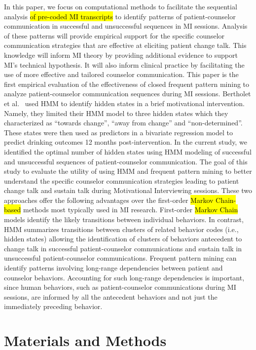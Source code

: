 \documentclass[smallextended]{svjour3}       %
\begin{document}
In this paper, we focus on computational methods to facilitate the sequential analysis \hl{of pre-coded MI transcripts} to identify patterns of patient-counselor communication in successful and unsuccessful sequences in MI sessions. Analysis of these patterns will provide empirical support for the specific counselor communication strategies that are effective at eliciting patient change talk. This knowledge will inform MI theory by providing additional evidence to support MI's technical hypothesis. It will also inform clinical practice by facilitating the use of more effective and tailored counselor communication. This paper is the first empirical evaluation of the effectiveness of closed frequent pattern mining to analyze patient-counselor communication sequences during MI sessions. Bertholet et al.~\cite{bertholet2010change} used HMM to identify hidden states in a brief motivational intervention. Namely, they limited their HMM model to three hidden states which they characterized as ``towards change'', ``away from change'' and ``non-determined''. These states were then used as predictors in a bivariate regression model to predict drinking outcomes 12 months post-intervention. In the current study, we identified the optimal number of hidden states using HMM modeling of successful and unsuccessful sequences of patient-counselor communication. The goal of this study to evaluate the utility of using HMM and frequent pattern mining to better understand the specific counselor communication strategies leading to patient change talk and sustain talk during Motivational Interviewing sessions. These two approaches offer the following advantages over the first-order \hl{Markov Chain-based} methods most typically used in MI research. First-order \hl{Markov Chain} models identify the likely transitions between individual behaviors. In contrast, HMM summarizes transitions between clusters of related behavior codes (i.e., hidden states) allowing the identification of clusters of behaviors antecedent to change talk in successful patient-counselor communications and sustain talk in unsuccessful patient-counselor communications. Frequent pattern mining can identify patterns involving long-range dependencies between patient and counselor behaviors. Accounting for such long-range dependencies is important, since human behaviors, such as patient-counselor communications during MI sessions, are informed by all the antecedent behaviors and not just the immediately preceding behavior.

\section{Materials and Methods}
\label{sec:materialsAndMethods}
\end{document}
